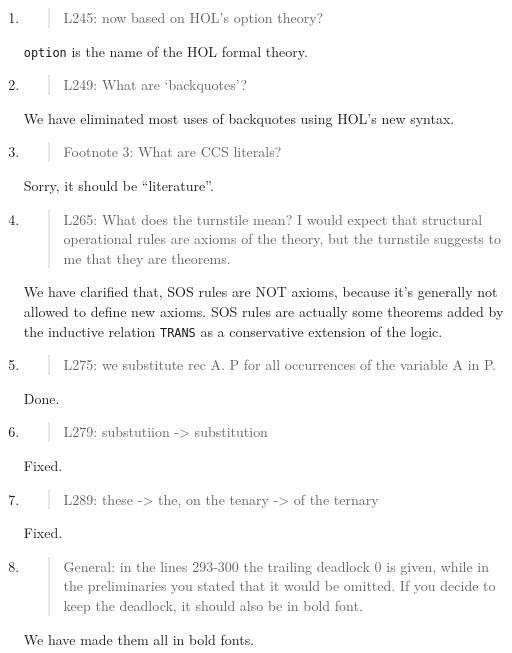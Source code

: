 \begin{enumerate}
\item \begin{quote}
    L245: now based on HOL’s option theory?
  \end{quote}
  \texttt{option} is the name of the HOL formal theory.
  
\item \begin{quote}
    L249: What are ‘backquotes’?
  \end{quote}
  We have eliminated most uses of backquotes using HOL's new syntax.
  
\item \begin{quote}
    Footnote 3: What are CCS literals?
  \end{quote}
  Sorry, it should be ``literature''.
  
\item \begin{quote}
    L265: What does the turnstile mean? I would expect that structural
    operational rules are axioms of the theory, but the turnstile
    suggests to me that they are theorems.
  \end{quote}
  We have clarified that, SOS rules are NOT axioms, because it's
  generally not allowed to define new axioms. SOS rules are actually
  some theorems added by the inductive relation \texttt{TRANS} as a
  conservative extension of the logic.
  
\item \begin{quote}
    L275: we substitute rec A. P for all occurrences of the variable A in P.
  \end{quote}
  Done.
  
\item \begin{quote}
    L279: substutiion -> substitution
  \end{quote}
  Fixed.
  
\item \begin{quote}
    L289: these -> the, on the tenary -> of the ternary
  \end{quote}
  Fixed.
  
\item \begin{quote}
    General: in the lines 293-300 the trailing deadlock 0 is given,
    while in the preliminaries you stated that it would be omitted. If
    you decide to keep the deadlock, it should also be in bold font.
  \end{quote}
  We have made them all in bold fonts.
  

\end{enumerate}
